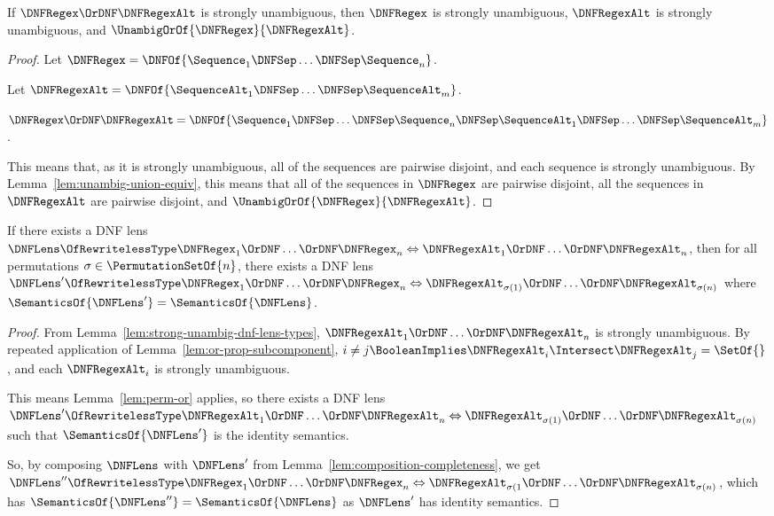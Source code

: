 \documentclass[sigplan,acmsmall]{acmart}
\begin{document}
\begin{lemma}
  \label{lem:or-prop-subcomponent}
  If $\DNFRegex \OrDNF \DNFRegexAlt$ is strongly unambiguous, then
  $\DNFRegex$ is strongly unambiguous, $\DNFRegexAlt$ is strongly unambiguous,
  and $\UnambigOrOf{\DNFRegex}{\DNFRegexAlt}$.
\end{lemma}
\begin{proof}
  Let $\DNFRegex = \DNFOf{\Sequence_1 \DNFSep \ldots \DNFSep \Sequence_n}$.

  Let $\DNFRegexAlt = \DNFOf{\SequenceAlt_1 \DNFSep \ldots \DNFSep
    \SequenceAlt_m}$.

  $\DNFRegex \OrDNF \DNFRegexAlt =
  \DNFOf{\Sequence_1 \DNFSep \ldots \DNFSep \Sequence_n \DNFSep \SequenceAlt_1 \DNFSep \ldots \DNFSep \SequenceAlt_m}$.

  This means that, as it is strongly unambiguous, all of the sequences are
  pairwise disjoint, and each sequence is strongly unambiguous.
  By Lemma~\ref{lem:unambig-union-equiv}, this means that
  all of the sequences in $\DNFRegex$ are pairwise disjoint, all the sequences
  in $\DNFRegexAlt$ are pairwise disjoint, and
  $\UnambigOrOf{\DNFRegex}{\DNFRegexAlt}$.
\end{proof}

\begin{lemma}
  \label{lem:or-dnf-reordering-right}
  If there exists a DNF lens $\DNFLens \OfRewritelessType \DNFRegex_1 \OrDNF \ldots
  \OrDNF \DNFRegex_n \Leftrightarrow
  \DNFRegexAlt_1 \OrDNF \ldots \OrDNF \DNFRegexAlt_n$, then for all permutations
  $\sigma \in \PermutationSetOf{n}$, there exists a DNF lens $\DNFLens'
  \OfRewritelessType \DNFRegex_1 \OrDNF \ldots \OrDNF \DNFRegex_n
  \Leftrightarrow
  \DNFRegexAlt_{\sigma(1)} \OrDNF \ldots \OrDNF \DNFRegexAlt_{\sigma(n)}$ where
  $\SemanticsOf{\DNFLens'} = \SemanticsOf{\DNFLens}$.
\end{lemma}
\begin{proof}
  From Lemma~\ref{lem:strong-unambig-dnf-lens-types},
  $\DNFRegexAlt_1 \OrDNF \ldots \OrDNF \DNFRegexAlt_n$ is strongly unambiguous.
  By repeated application of Lemma~\ref{lem:or-prop-subcomponent},
  $i \neq j \BooleanImplies \DNFRegexAlt_i \Intersect \DNFRegexAlt_j =
  \SetOf{}$, and each $\DNFRegexAlt_i$ is strongly unambiguous.

  This means Lemma~\ref{lem:perm-or} applies, so there exists a DNF lens
  $\DNFLens' \OfRewritelessType \DNFRegexAlt_1 \OrDNF \ldots \OrDNF
  \DNFRegexAlt_n \Leftrightarrow
  \DNFRegexAlt_{\sigma(1)} \OrDNF \ldots \OrDNF \DNFRegexAlt_{\sigma(n)}$ such
  that $\SemanticsOf{\DNFLens'}$ is the identity semantics.

  So, by composing $\DNFLens$ with $\DNFLens'$ from
  Lemma~\ref{lem:composition-completeness}, we get\\
  $\DNFLens'' \OfRewritelessType \DNFRegex_1 \OrDNF \ldots \OrDNF \DNFRegex_n
  \Leftrightarrow \DNFRegexAlt_{\sigma(1} \OrDNF \ldots \OrDNF
  \DNFRegexAlt_{\sigma(n)}$, which has $\SemanticsOf{\DNFLens''} =
  \SemanticsOf{\DNFLens}$ as $\DNFLens'$ has identity semantics.
\end{proof}
\end{document}
